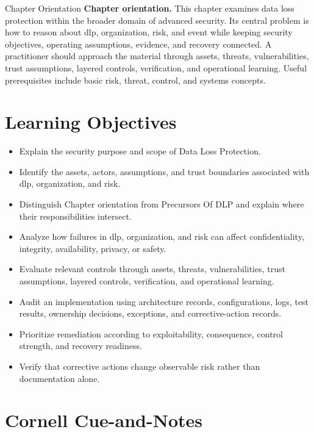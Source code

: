 \documentclass[11pt,letterpaper]{article}
\title{\CornellDocumentTitle}
\author{}
\date{}
\begin{document}
\maketitle
\begin{CornellOverviewBox}{Chapter Orientation}
\textbf{Chapter orientation.} This chapter examines data loss protection within the broader domain of advanced security. Its central problem is how to reason about dlp, organization, risk, and event while keeping security objectives, operating assumptions, evidence, and recovery connected. A practitioner should approach the material through assets, threats, vulnerabilities, trust assumptions, layered controls, verification, and operational learning. Useful prerequisites include basic risk, threat, control, and systems concepts.
\end{CornellOverviewBox}
\section*{Learning Objectives}
\begin{itemize}
\item Explain the security purpose and scope of Data Loss Protection.
\item Identify the assets, actors, assumptions, and trust boundaries associated with dlp, organization, and risk.
\item Distinguish Chapter orientation from Precursors Of DLP and explain where their responsibilities intersect.
\item Analyze how failures in dlp, organization, and risk can affect confidentiality, integrity, availability, privacy, or safety.
\item Evaluate relevant controls through assets, threats, vulnerabilities, trust assumptions, layered controls, verification, and operational learning.
\item Audit an implementation using architecture records, configurations, logs, test results, ownership decisions, exceptions, and corrective-action records.
\item Prioritize remediation according to exploitability, consequence, control strength, and recovery readiness.
\item Verify that corrective actions change observable risk rather than documentation alone.
\end{itemize}
\section*{Cornell Cue-and-Notes}
\end{document}
